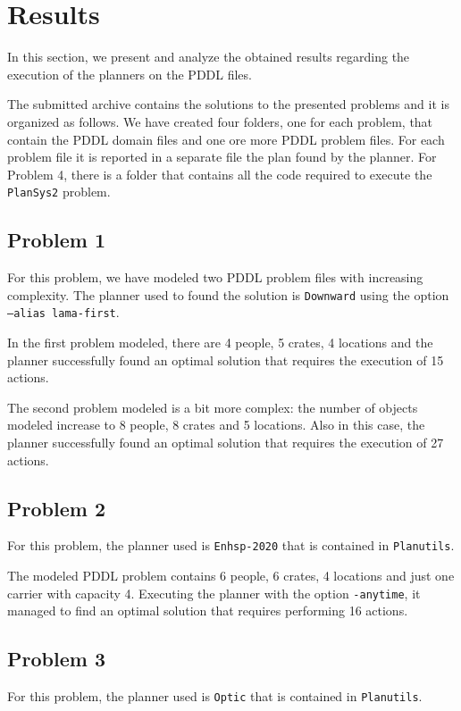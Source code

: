 \section{Results}
\label{sec4}
In this section, we present and analyze the obtained results regarding the execution of the planners on 
the PDDL files.

The submitted archive contains the solutions to the presented problems and it is organized as follows.
We have created four folders, one for each problem, that contain the PDDL domain files and one ore more 
PDDL problem files. For each problem file it is reported in a separate file the plan found by the planner.
For Problem 4, there is a folder that contains all the code required to execute the \texttt{PlanSys2} 
problem.


\subsection{Problem 1}
For this problem, we have modeled two PDDL problem files with increasing complexity.
The planner used to found the solution is \texttt{Downward} using the option \texttt{--alias lama-first}.

In the first problem modeled, there are 4 people, 5 crates, 4 locations and the planner successfully
found an optimal solution that requires the execution of 15 actions.

The second problem modeled is a bit more complex: the number of objects modeled increase to 8 people, 
8 crates and 5 locations. Also in this case, the planner successfully
found an optimal solution that requires the execution of 27 actions.


\subsection{Problem 2}
For this problem, the planner used is \texttt{Enhsp-2020} that is contained in \texttt{Planutils}.

The modeled PDDL problem contains 6 people, 6 crates, 4 locations and just one carrier with capacity 4.
Executing the planner with the option \texttt{-anytime}, it managed to find an optimal solution that 
requires performing 16 actions.

\subsection{Problem 3}
For this problem, the planner used is \texttt{Optic} that is contained in \texttt{Planutils}.


